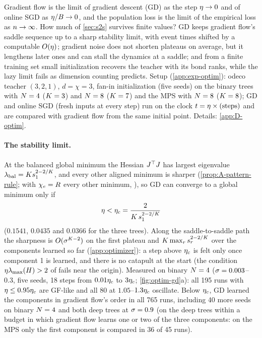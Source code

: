 Gradient flow is the limit of gradient descent (GD) as the step $\eta\to0$ and of online SGD as
$\eta/B\to0$, and the population loss is the limit of the empirical loss as $n\to\infty$. How much of
\cref{sec:s2s} survives finite values? GD keeps gradient flow's saddle sequence up to a sharp stability limit,
with event times shifted by a computable $O(\eta)$; gradient noise does not shorten plateaus on average, but it
lengthens later ones and can stall the dynamics at a saddle; and from a finite training set small initialization
recovers the teacher with its bond ranks, while the lazy limit fails as dimension counting predicts. Setup
(\cref{app:exp-optim}): odeco teacher $(3,2,1)$, $d=\chi=3$, fan-in initialization (five seeds) on the binary trees
with $N=4$ ($K=3$) and $N=8$ ($K=7$) and the MPS with $N=8$ ($K=8$); GD and online SGD (fresh inputs at
every step) run on the clock $t=\eta\times(\text{steps})$ and are compared with gradient flow from the same initial
point. Details: \cref{app:D-optim}.

\paragraph{The stability limit.}
\proven{} 
 At the balanced global minimum the Hessian $J^{\top} J$ has largest eigenvalue
$\lambda_{\rm bal}=Ks_{1}^{2-2/K}$, and every other aligned minimum is sharper (\cref{prop:A-pattern-rule};
with $\chi_{e}=R$ every other minimum, \derived), so GD can converge to a global minimum only if
\begin{equation}\label{eq:optim-etac}
  \eta<\eta_c=\frac{2}{K\,s_{1}^{2-2/K}}
\end{equation}
($0.1541$, $0.0435$ and $0.0366$ for the three trees). Along the saddle-to-saddle path the sharpness is
$O(\sigma^{K-2})$ on the first plateau and $K\max_rs_{r}^{2-2/K}$ over the components learned so far
\derived{} (\cref{app:optimizer}): a step above $\eta_c$ is felt only once component 1 is learned, and there is no
catapult at the start (the condition $\eta\lambda_{\max}(H)>2$ of \citet{lewkowycz2020large} fails near the
origin). Measured \empirical{} on binary $N=4$ ($\sigma=0.003$--$0.3$, five seeds, 18 steps from $0.01\eta_c$ to
$3\eta_c$; \cref{fig:optim-gd}a): all 195 runs with $\eta\le0.95\eta_c$ are GF-like and all 80 at $1.05$--$1.3\eta_c$
oscillate. Below $\eta_c$, GD learned the components in gradient flow's order in all 765 runs, including 40 more
seeds on binary $N=4$ and both deep trees at $\sigma=0.9$ (on the deep trees within a budget in which gradient flow
learns one or two of the three components: on the MPS only the first component is compared in 36 of 45 runs).


